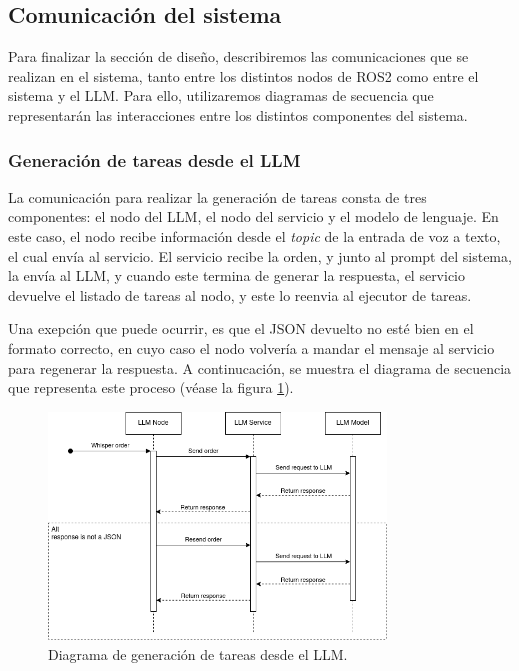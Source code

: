 \documentclass[../main.tex]{subfiles}
\begin{document}
\subsection{Comunicación del sistema}
Para finalizar la sección de diseño, describiremos las comunicaciones que se realizan en el sistema, tanto entre los distintos nodos de ROS2 como entre el sistema y el LLM. Para ello, utilizaremos diagramas de secuencia que representarán las interacciones entre los distintos componentes del sistema.

\subsubsection{Generación de tareas desde el LLM}
La comunicación para realizar la generación de tareas consta de tres componentes: el nodo del LLM, el nodo del servicio y el modelo de lenguaje. En este caso, el nodo recibe información desde el \textit{topic} de la entrada de voz a texto, el cual envía al servicio. El servicio recibe la orden, y junto al prompt del sistema, la envía al LLM, y cuando este
termina de generar la respuesta, el servicio devuelve el listado de tareas al nodo, y este lo reenvia al ejecutor de tareas. 

Una exepción que puede ocurrir, es que el JSON devuelto no esté bien en el formato correcto, en cuyo caso el nodo
volvería a mandar el mensaje al servicio para regenerar la respuesta. A continucación, se muestra el diagrama de secuencia que representa este proceso (véase la figura \ref{fig:diseno_seq_llm}).

\begin{figure}[H]
    \centering
    \includegraphics[width=0.8\textwidth]{images/diseno_seq_llm.png}
    \caption{Diagrama de generación de tareas desde el LLM.}\label{fig:diseno_seq_llm}
\end{figure}
\end{document}
